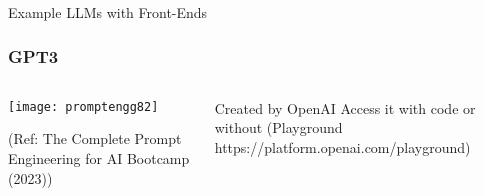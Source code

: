 




\begin{frame}[fragile]\frametitle{}
\begin{center}
{\Large Example LLMs with Front-Ends}

\end{center}
\end{frame}



\begin{frame}[fragile]\frametitle{GPT3}


\begin{columns}
    \begin{column}[T]{0.6\linewidth}
		\begin{center}
		\texttt{[image: promptengg82]}

		{\tiny (Ref: The Complete Prompt Engineering for AI Bootcamp (2023))}
		\end{center}	
    \end{column}
    \begin{column}[T]{0.4\linewidth}
		Created by OpenAI
		Access it with code or without (Playground https://platform.openai.com/playground)
    \end{column}
  \end{columns}
\end{frame}

